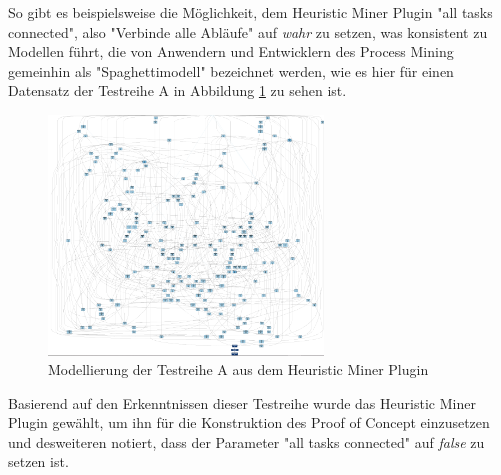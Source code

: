 So gibt es beispielsweise die Möglichkeit, dem Heuristic Miner Plugin "all tasks connected", also "Verbinde alle Abläufe" auf \textit{wahr} zu setzen, was konsistent zu Modellen führt, die von Anwendern und Entwicklern des Process Mining gemeinhin als "Spaghettimodell" bezeichnet werden, wie es hier für einen Datensatz der Testreihe A in Abbildung \ref{fig:A_heuristic_spagh} zu sehen ist.
\begin{figure}[!ht]
    \centering
    \includegraphics[width=0.65\textwidth,]{figures/Appbildungen/A_underfitted.PNG}
    \caption{Modellierung der Testreihe A aus dem Heuristic Miner Plugin}
    \label{fig:A_heuristic_spagh}
\end{figure}

Basierend auf den Erkenntnissen dieser Testreihe wurde das Heuristic Miner Plugin gewählt, um ihn für die Konstruktion des Proof of Concept einzusetzen und desweiteren notiert, dass der Parameter "all tasks connected" auf \textit{false} zu setzen ist.





